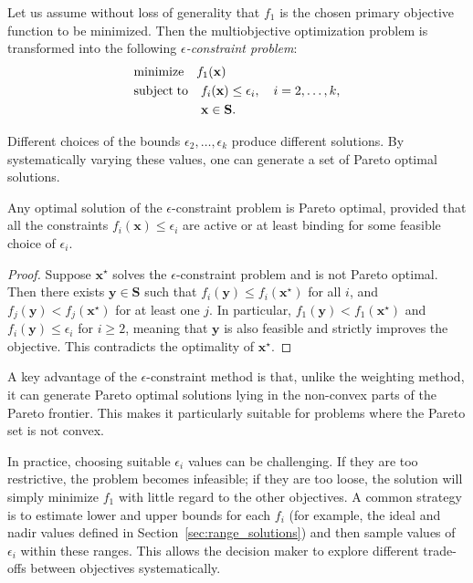 Let us assume without loss of generality that $f_1$ is the chosen primary objective function to be minimized. Then the multiobjective optimization problem is transformed into the following \emph{$\epsilon$-constraint problem}:
\begin{align*}
     & \text{minimize}    \quad f_1(\mathbf{x}) \\
     & \text{subject\;to} \quad f_i(\mathbf{x}) \le \epsilon_i, \quad i = 2, \ldots, k, \\
     & \phantom{\text{subject\;to}}\quad \mathbf{x} \in \mathbf{S}.
\end{align*}

Different choices of the bounds $\epsilon_2,\ldots,\epsilon_k$ produce different solutions. By systematically varying these values, one can generate a set of Pareto optimal solutions.

\begin{proposition}
\label{prop:epsilon_constraint_pareto_optimal}
Any optimal solution of the $\epsilon$-constraint problem is Pareto optimal, provided that all the constraints $f_i(\mathbf{x}) \le \epsilon_i$ are active or at least binding for some feasible choice of $\epsilon_i$.
\end{proposition}
\begin{proof}
Suppose $\mathbf{x}^\star$ solves the $\epsilon$-constraint problem and is not Pareto optimal. Then there exists $\mathbf{y} \in \mathbf{S}$ such that $f_i(\mathbf{y}) \le f_i(\mathbf{x}^\star)$ for all $i$, and $f_j(\mathbf{y}) < f_j(\mathbf{x}^\star)$ for at least one $j$. In particular, $f_1(\mathbf{y}) < f_1(\mathbf{x}^\star)$ and $f_i(\mathbf{y}) \le \epsilon_i$ for $i\ge2$, meaning that $\mathbf{y}$ is also feasible and strictly improves the objective. This contradicts the optimality of $\mathbf{x}^\star$.
\end{proof}

A key advantage of the $\epsilon$-constraint method is that, unlike the weighting method, it can generate Pareto optimal solutions lying in the non-convex parts of the Pareto frontier. This makes it particularly suitable for problems where the Pareto set is not convex.

In practice, choosing suitable $\epsilon_i$ values can be challenging. If they are too restrictive, the problem becomes infeasible; if they are too loose, the solution will simply minimize $f_1$ with little regard to the other objectives. A common strategy is to estimate lower and upper bounds for each $f_i$ (for example, the ideal and nadir values defined in Section~\ref{sec:range_solutions}) and then sample values of $\epsilon_i$ within these ranges. This allows the decision maker to explore different trade-offs between objectives systematically.

